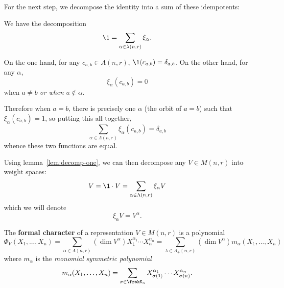 \documentclass[12pt]{article}
\begin{document}
For the next step, we decompose the identity into a sum of these idempotents:
\begin{lem}\label{lem:decomp-one}
	We have the decomposition 
	\[\1 = \sum_{\alpha\in\lambda(n,r)} \xi_\alpha.\]
\end{lem}
\begin{prf}
	On the one hand, for any $c_{a,b}\in A(n,r)$, $\1(c_{a,b})=\delta_{a,b}$. On the other hand, for any $\alpha$,
	\[\xi_\alpha(c_{a,b})=0\]
	when $a\ne b$ \textit{or when $a\notin \alpha$}. 
	
	Therefore when $a=b$, there is precisely one $\alpha$ (the orbit of $a=b$)
	such that $\xi_\alpha(c_{a,b})=1$, so putting this all together,
	\[\sum_{\alpha\in\Lambda(n,r)}\xi_\alpha(c_{a,b})=\delta_{a,b}\]
	whence these two functions are equal.
\end{prf}
Using lemma~\ref{lem:decomp-one}, we can then decompose any $V\in M(n,r)$ into weight spaces:
\[V=\1\cdot V=\sum_{\alpha\in\Lambda(n,r)}\xi_\alpha V\]
which we will denote 
\[\xi_\alpha V=V^\alpha.\]

\begin{defn}
	The \textbf{formal character} of a representation $V\in M(n,r)$ is a polynomial 
	\[\Phi_V(X_1,\dots,X_n)=\sum_{\alpha\in\Lambda(n,r)}(\dim V^\alpha)X_1^{\alpha_1}\cdots X_n^{\alpha_n}=\sum_{\lambda\in\Lambda_+(n,r)}(\dim V^\alpha)m_\alpha(X_1,\dots,X_n)\]
	where $m_\alpha$ is the \textit{monomial symmetric polynomial}
	\[m_\alpha(X_1,\dots,X_n)=\sum_{\sigma\in\frakS_n}X_{\sigma(1)}^{\alpha_1}\cdots X_{\sigma(n)}^{\alpha_n}.\]
\end{defn}
\end{document}
